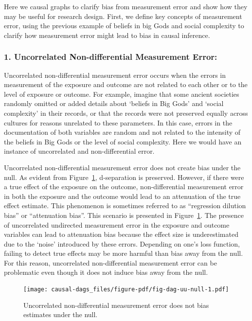 \documentclass[
  singlecolumn]{report}
\begin{document}
Here we causal graphs to clarify bias from measurement error and show
how they may be useful for research design. First, we define key
concepts of measurement error, using the previous example of beliefs in
big Gods and social complexity to clarify how measurement error might
lead to bias in causal inference.

\hypertarget{uncorrelated-non-differential-measurement-error}{%
\subsubsection{\texorpdfstring{1. \textbf{Uncorrelated Non-differential
Measurement
Error:}}{1. Uncorrelated Non-differential Measurement Error:}}\label{uncorrelated-non-differential-measurement-error}}

Uncorrelated non-differential measurement error occurs when the errors
in measurement of the exposure and outcome are not related to each other
or to the level of exposure or outcome. For example, imagine that some
ancient societies randomly omitted or added details about `beliefs in
Big Gods' and `social complexity' in their records, or that the records
were not preserved equally across cultures for reasons unrelated to
these parameters. In this case, errors in the documentation of both
variables are random and not related to the intensity of the beliefs in
Big Gods or the level of social complexity. Here we would have an
instance of uncorrelated and non-differential error.

Uncorrelated non-differential measurement error does not create bias
under the null. As evident from Figure~\ref{fig-dag-uu-null},
d-separation is preserved. However, if there were a true effect of the
exposure on the outcome, non-differential measurement error in both the
exposure and the outcome would lead to an attenuation of the true effect
estimate. This phenomenon is sometimes referred to as ``regression
dilution bias'' or ``attenuation bias''. This scenario is presented in
Figure~\ref{fig-dag-uu-null}. The presence of uncorrelated undirected
measurement error in the exposure and outcome variables can lead to
attenuation bias because the effect size is underestimated due to the
`noise' introduced by these errors. Depending on one's loss function,
failing to detect true effects may be more harmful than bias away from
the null. For this reason, uncorrelated non-differential measurement
error can be problematic even though it does not induce bias away from
the null.

\begin{figure}

{\centering \texttt{[image: causal-dags\_files/figure-pdf/fig-dag-uu-null-1.pdf]}

}

\caption{\label{fig-dag-uu-null}Uncorrelated non-differential
measurement error does not bias estimates under the null.}

\end{figure}
\end{document}
